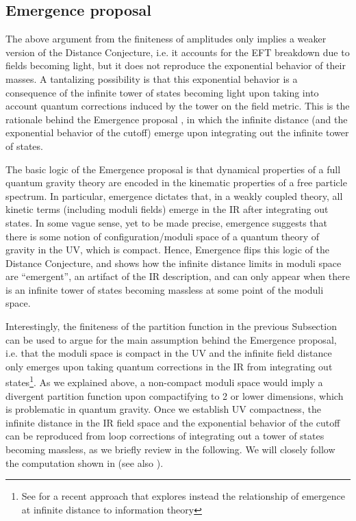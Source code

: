 \documentclass[11pt]{article}
\numberwithin{equation}{section}
\numberwithin{equation}{section}
\theoremstyle{remark}
\begin{document}
\subsection{Emergence proposal}
 

The above argument from the finiteness of amplitudes only implies a weaker version of the Distance Conjecture, i.e. it accounts for the EFT breakdown due to fields becoming light, but it does not reproduce the exponential behavior of their masses. A tantalizing possibility is that this exponential behavior is a consequence of the infinite tower of states becoming light upon taking into account quantum corrections induced by the tower on the field metric. This is the rationale behind the Emergence proposal \cite{Grimm:2018ohb,Heidenreich:2018kpg}, in which the infinite distance (and the exponential behavior of the cutoff) emerge upon integrating out the infinite tower of states.


The basic logic of the Emergence proposal \cite{Palti:2019pca,vanBeest:2021lhn} is that dynamical properties of a full quantum gravity theory are encoded in the kinematic properties of a free particle spectrum.  In particular, emergence dictates that, in a weakly coupled theory, all kinetic terms (including moduli fields) emerge in the IR after integrating out states. In some vague sense, yet to be made precise, emergence suggests that there is some notion of configuration/moduli space of a quantum theory of gravity in the UV, which is compact.   Hence, Emergence flips this logic of the Distance Conjecture, and shows how the infinite distance limits in moduli space are ``emergent'', an artifact of the IR description, and can only appear when there is an infinite tower of states becoming massless at some point of the moduli space.

Interestingly, the finiteness of the partition function in the previous Subsection can be used to argue for the main assumption behind the Emergence proposal, i.e. that the moduli space is compact in the UV and the infinite field distance only emerges upon taking quantum corrections in the IR from integrating out states\footnote{See \cite{Stout:2021ubb} for a recent approach that explores instead the relationship of emergence at infinite distance to information theory}.   As we explained above, a non-compact moduli space would imply a divergent partition function upon compactifying to 2 or lower dimensions, which is problematic in quantum gravity. Once we establish UV compactness, the infinite distance in the IR field space and the exponential behavior of the cutoff can be reproduced from loop corrections of integrating out a tower of states becoming massless, as we briefly review in the following.   We will closely follow the computation shown in \cite{Corvilain:2018lgw} (see also \cite{Grimm:2018ohb,Heidenreich:2018kpg}).
\end{document}
